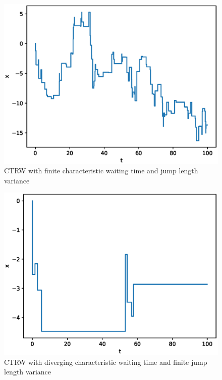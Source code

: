 \documentclass[aps, pre, preprint, amsmath, amssymb]{revtex4}
\begin{document}
\begin{figure}[H]
\centering	
\includegraphics[scale=0.5]{figures/ctrw1}	
\caption{CTRW with finite characteristic waiting time and jump length variance}
\end{figure}
\begin{figure}[H]
\centering	
\includegraphics[scale=0.5]{figures/ctrw2}	
\caption{CTRW with diverging characteristic waiting time and finite jump length variance}
\end{figure}
\end{document}
